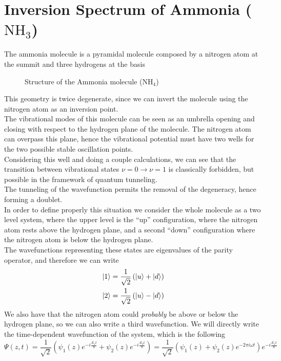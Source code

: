\documentclass[../qm.tex]{subfiles}
\begin{document}
	\section{Inversion Spectrum of Ammonia ($\mathrm{NH_3}$)}
	The ammonia molecule is a pyramidal molecule composed by a nitrogen atom at the summit and three hydrogens at the basis
	\begin{figure}[H]
		\centering
		\caption{Structure of the Ammonia molecule ($\mathrm{NH_4}$)}
		\label{fig:ammoniamol}
	\end{figure}
	This geometry is twice degenerate, since we can invert the molecule using the nitrogen atom as an inversion point.\\
	The vibrational modes of this molecule can be seen as an umbrella opening and closing with respect to the hydrogen plane of the molecule. The nitrogen atom can overpass this plane, hence the vibrational potential must have two wells for the two possible stable oscillation points.\\
	Considering this well and doing a couple calculations, we can see that the transition between vibrational states $\nu=0\to\nu=1$ is classically forbidden, but possible in the framework of quantum tunneling.\\
	The tunneling of the wavefunction permits the removal of the degeneracy, hence forming a doublet.\\
	In order to define properly this situation we consider the whole molecule as a two level system, where the upper level is the ``up'' configuration, where the nitrogen atom rests above the hydrogen plane, and a second ``down'' configuration where the nitrogen atom is below the hydrogen plane.\\
	The wavefunctions representing these states are eigenvalues of the parity operator, and therefore we can write
	\begin{equation}
		\begin{aligned}
			\ket{1}&=\frac{1}{\sqrt{2}}\left( \ket{u}+\ket{d} \right)\\
			\ket{2}&=\frac{1}{\sqrt{2}}\left( \ket{u}-\ket{d} \right)
		\end{aligned}
		\label{eq:nitrogeninversion}
	\end{equation}
	We also have that the nitrogen atom could \textit{probably} be above or below the hydrogen plane, so we can also write a third wavefunction. We will directly write the time-dependent wavefunction of the system, which is the following
	\begin{equation}
		\Psi(z,t)=\frac{1}{\sqrt{2}}\left( \psi_1(z)e^{-i\frac{E_1t}{\hbar}}+\psi_2(z)e^{-i\frac{E_2t}{\hbar}} \right)=\frac{1}{\sqrt{2}}\left( \psi_1(z)+\psi_2(z)e^{-2\pi i\omega t} \right)e^{-i\frac{E_1t}{\hbar}}
		\label{eq:psibignh3}
	\end{equation}
\end{document}
